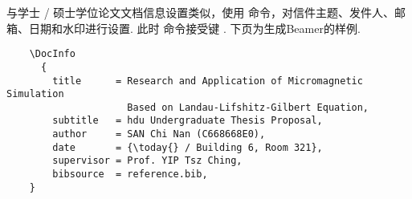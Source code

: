 与学士 / 硕士学位论文文档信息设置类似，使用  命令，对信件主题、发件人、邮箱、日期和水印进行设置. 此时  命令接受键
     . 下页为生成Beamer的样例.

\begin{framed}
  \begin{verbatim}
    \DocInfo
      {
        title      = Research and Application of Micromagnetic Simulation
                     Based on Landau-Lifshitz-Gilbert Equation,
        subtitle   = hdu Undergraduate Thesis Proposal,
        author     = SAN Chi Nan (C668668E0),
        date       = {\today{} / Building 6, Room 321},
        supervisor = Prof. YIP Tsz Ching,
        bibsource  = reference.bib,
    }
  \end{verbatim}
\end{framed}

\begin{center}
  
\end{center}
